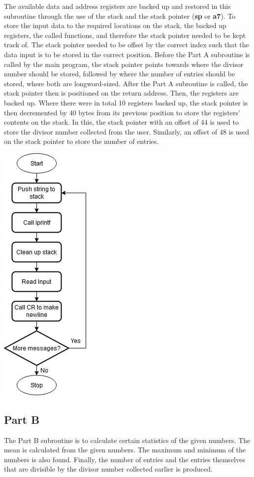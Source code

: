 \documentclass[12pt]{article}
\begin{document}
The available data and address registers are backed up and restored in this subroutine through the use of the stack and the stack pointer (\textbf{sp} or \textbf{a7}). To store the input data to the required locations on the stack, the backed up registers, the called functions, and therefore the stack pointer needed to be kept track of. The stack pointer needed to be offset by the correct index such that the data input is to be stored in the correct position. Before the Part A subroutine is called by the main program, the stack pointer points towards where the divisor number should be stored, followed by where the number of entries should be stored, where both are longword-sized. After the Part A subroutine is called, the stack pointer then is positioned on the return address. Then, the registers are backed up. Where there were in total 10 registers backed up, the stack pointer is then decremented by 40 bytes from its previous position to store the registers' contents on the stack.  In this, the stack pointer with an offset of 44 is used to store the divisor number collected from the user. Similarly, an offset of 48 is used on the stack pointer to store the number of entries.
\begin{center}
\includegraphics[scale = 0.5]{./PartA.PNG}
\end{center}
\subsection{Part B}
The Part B subroutine is to calculate certain statistics of the given numbers. The mean is calculated from the given numbers. The maximum and minimum of the numbers is also found. Finally, the number of entries and the entries themselves that are divisible by the divisor number collected earlier is produced. 
\end{document}
